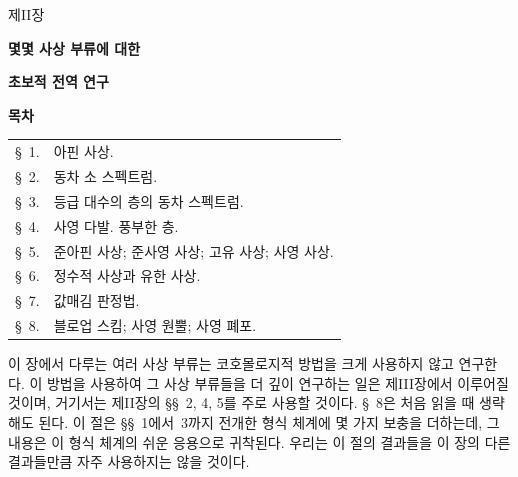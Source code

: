 \clearpage
\thispagestyle{plain}
\label{chapter:II-ko}

\begin{center}
{\large 제II장\par}
\vspace{1.5em}
{\Large\bfseries 몇몇 사상 부류에 대한\par}
{\Large\bfseries 초보적 전역 연구\par}
\vspace{1.8em}
{\bfseries 목차\par}
\end{center}

\medskip
\begin{tabular}{@{}r@{\ }p{}@{}}
\S~1. & 아핀 사상.\\
\S~2. & 동차 소 스펙트럼.\\
\S~3. & 등급 대수의 층의 동차 스펙트럼.\\
\S~4. & 사영 다발. 풍부한 층.\\
\S~5. & 준아핀 사상; 준사영 사상; 고유 사상; 사영 사상.\\
\S~6. & 정수적 사상과 유한 사상.\\
\S~7. & 값매김 판정법.\\
\S~8. & 블로업 스킴; 사영 원뿔; 사영 폐포.
\end{tabular}

\medskip
이 장에서 다루는 여러 사상 부류는 코호몰로지적 방법을 크게 사용하지
않고 연구한다. 이 방법을 사용하여 그 사상 부류들을 더 깊이 연구하는
일은 제III장에서 이루어질 것이며, 거기서는 제II장의 \S\S~2, 4, 5를
주로 사용할 것이다. \S~8은 처음 읽을 때 생략해도 된다. 이 절은
\S\S~1에서~3까지 전개한 형식 체계에 몇 가지 보충을 더하는데, 그
내용은 이 형식 체계의 쉬운 응용으로 귀착된다. 우리는 이 절의 결과들을
이 장의 다른 결과들만큼 자주 사용하지는 않을 것이다.
